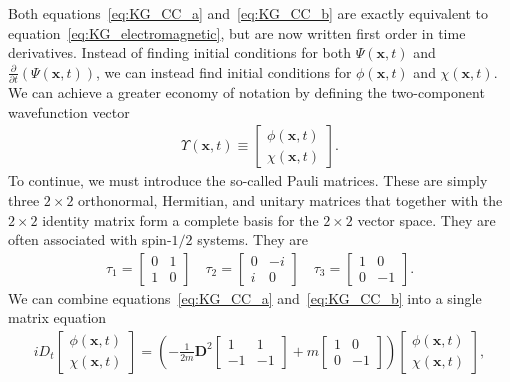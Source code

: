 \documentclass[titlepage,letterpaper,onecolumn,11pt,final]{report}
\numberwithin{equation}{section}
\numberwithin{figure}{section}
\begin{document}
Both equations~\ref{eq:KG_CC_a} and~\ref{eq:KG_CC_b} are exactly equivalent to equation~\ref{eq:KG_electromagnetic}, but are now written first order in time derivatives. Instead of finding initial conditions for both $\Psi (\mathbf{x}, t)$ and $\frac{\partial}{\partial t} \left( \Psi (\mathbf{x}, t) \right)$, we can instead find initial conditions for $\phi (\mathbf{x}, t)$ and $\chi (\mathbf{x}, t)$. We can achieve a greater economy of notation by defining the two-component wavefunction vector
\begin{gather}
	\Upsilon (\mathbf{x}, t) \equiv 
	\begin{bmatrix}
		\phi (\mathbf{x}, t) \\[6pt]
		\chi (\mathbf{x}, t)
	\end{bmatrix} .
\end{gather}
To continue, we must introduce the so-called Pauli matrices. These are simply three $2 \times 2$ orthonormal, Hermitian, and unitary matrices that together with the $2 \times 2$ identity matrix form a complete basis for the $2 \times 2$ vector space. They are often associated with spin-$1/2$ systems. They are
\begin{gather}
	\label{Pauli_matrices}
	\tau_{1} = 
	\begin{bmatrix}
		0 & 1 \\[6pt]
		1 & 0
	\end{bmatrix} \quad
	\tau_{2} = 
	\begin{bmatrix}
		0 & -i \\[6pt]
		i & 0
	\end{bmatrix} \quad
	\tau_{3} = 
	\begin{bmatrix}
		1 & 0 \\[6pt]
		0 & -1
	\end{bmatrix} .
\end{gather}
%
We can combine equations~\ref{eq:KG_CC_a} and~\ref{eq:KG_CC_b} into a single matrix equation
\begin{gather}
	\label{eq:KG_electromagnetism_matrix}
	i D_{t} 
	\begin{bmatrix}
		\phi (\mathbf{x}, t) \\[6pt]
		\chi (\mathbf{x}, t)
	\end{bmatrix} 
	= \left( -\frac{1}{2 m} \mathbf{D}^{2} 
	\begin{bmatrix}
		1  & 1 \\[6pt]
		-1 & -1
	\end{bmatrix}
 + m 
	\begin{bmatrix}
		1 & 0 \\[6pt]
		0 & -1
	\end{bmatrix}
 \right) 
	\begin{bmatrix}
		\phi (\mathbf{x}, t) \\[6pt]
		\chi (\mathbf{x}, t)
	\end{bmatrix} ,
\end{gather}
\end{document}
